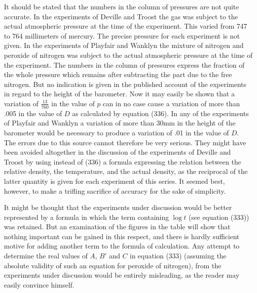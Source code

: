 \documentclass[12pt]{article}
\begin{document}
It should be stated that the numbers in the column of pressures are not quite accurate.  In the experiments of Deville and Troost the gas was subject to the actual atmospheric pressure at the time of the experiment. This varied from 747 to 764 millimeters of mercury. The precise pressure for each experiment is not given. In the experiments of Playfair and Wanklyn the mixture of nitrogen and peroxide of nitrogen was subject to the actual atmospheric pressure at the time of the experiment. The numbers in the column of pressures express the fraction of the whole pressure which remains after subtracting the part due to the free nitrogen. But no indication is given in the published account of the experiments in regard to the height of the barometer. Now it may easily be shown that a variation of $\frac{13}{760}$ in the value of $p$ can in no case cause a variation of more than .005 in the value of $D$ as calculated by equation (336). In any of the experiments of Playfair and Wanklyn a variation of more than 30mm in the height of the barometer would be necessary to produce a variation of .01 in the value of $D$. The errors due to this source cannot therefore be very serious. They might have been avoided altogether in the discussion of the experiments of Deville and Troost by using instead of (336) a formula expressing the relation between the relative density, the temperature, and the actual density, as the reciprocal of the latter quantity is given for each experiment of this series. It seemed best, however, to make a trifling sacrifice of accuracy for the sake of simplicity.


It might be thought that the experiments under discussion would be better represented by a formula in which the term containing $\log t$ (see equation (333)) was retained. But an examination of the figures in the table will show that nothing important can be gained in this respect, and there is hardly sufficient motive for adding another term to the formula of calculation.  Any attempt to determine the real values of $A$, $B'$ and $C$ in equation (333) (assuming the absolute validity of such an equation for peroxide of nitrogen), from the experiments under discussion would be entirely misleading, as the reader may easily convince himself.
\end{document}
